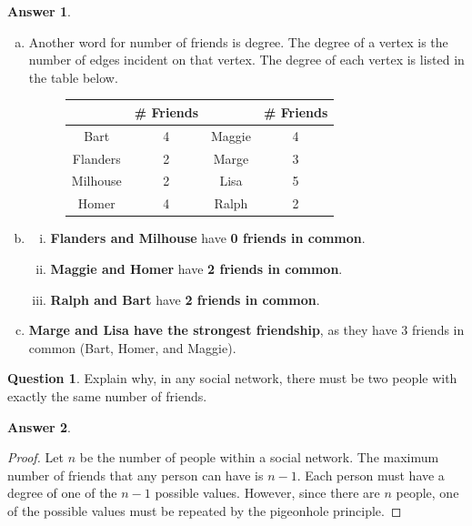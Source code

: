 \documentclass[article, 12pt]{article}
\theoremstyle{definition}
\newtheorem{question}{Question}
\newtheorem{answer}{Answer}
\begin{document}
    \begin{answer} \
        \begin{enumerate}[(a)]
            \item Another word for number of friends is degree. The degree of a vertex is the number of edges incident on that vertex. The degree of each vertex is listed in the table below.             
            \begin{figure}[H]
                \centering
                \begin{tabular}{|c|c|c|c|}
                    \hline
                    & \# Friends & & \# Friends \\
                    \hline
                    Bart & 4 & Maggie & 4 \\
                    \hline
                    Flanders & 2 & Marge & 3 \\
                    \hline
                    Milhouse & 2 & Lisa & 5 \\
                    \hline
                    Homer & 4 & Ralph & 2 \\
                    \hline
                \end{tabular}
            \end{figure}
            \item \begin{enumerate}[(i)]
                \item \textbf{Flanders and Milhouse} have \textbf{0 friends in common}.
                \item \textbf{Maggie and Homer} have \textbf{2 friends in common}.
                \item \textbf{Ralph and Bart} have \textbf{2 friends in common}.
            \end{enumerate}
            \item \textbf{Marge and Lisa have the strongest friendship}, as they have 3 friends in common (Bart, Homer, and Maggie).
        \end{enumerate}
    \end{answer}
    \begin{question}
        Explain why, in any social network, there must be two people with exactly the same number of friends.
    \end{question}
    \begin{answer}
        \begin{proof}
            Let $n$ be the number of people within a social network. The maximum number of friends that any person can have is $n-1$. Each person must have a degree of one of the $n-1$ possible values. However, since there are $n$ people, one of the possible values must be repeated by the pigeonhole principle.
        \end{proof}
    \end{answer}
\end{document}
